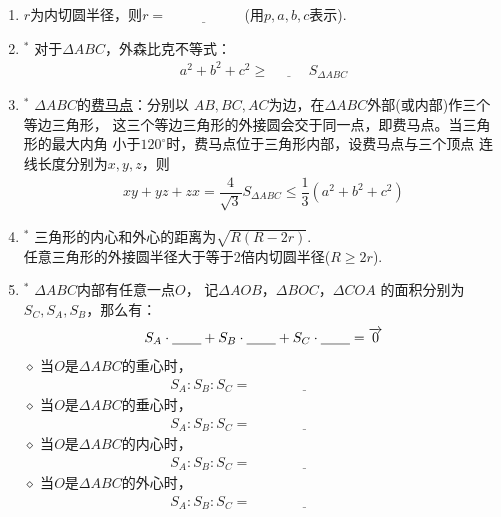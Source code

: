 \documentclass{article}
\newif\ifte
\renewcommand{\vec}{\overrightarrow}
\renewcommand\leq\leqslant
\renewcommand\geq\geqslant
\begin{document}
\begin{multicols}{2}
\begin{enumerate}[leftmargin=20pt]
\item $ r $为内切圆半径，则$ r=\underline{\ \ifte 
    \sqrt{\dfrac{(p-a)(p-b)(p-c)}{p}}\else \hspace{2cm} \fi\ } $
\ifte \else (用$ p,a,b,c $表示)\fi.

\item $^*$ 对于$ \Delta ABC $，外森比克不等式：
\begin{gather*}
    a^2+b^2+c^2 \geq \underline{\ \ifte 
        4\sqrt{3}\else \hspace{1cm} \fi\ }S_{\Delta ABC} 
\end{gather*}

\item $^*$ $ \Delta ABC $的\underline{费马点}：分别以
$ AB,BC,AC $为边，在$ \Delta ABC $外部(或内部)作三个等边三角形，
这三个等边三角形的外接圆会交于同一点，即费马点。当三角形的最大内角
小于$ 120^{\circ} $时，费马点位于三角形内部，设费马点与三个顶点
连线长度分别为$ x,y,z $，则
\begin{gather*}
    xy+yz+zx=\dfrac{4}{\sqrt{3}}S_{\Delta ABC}\leq 
    \dfrac{1}{3}(a^2+b^2+c^2)
\end{gather*}

\item $^*$ 三角形的内心和外心的距离为$ \sqrt{R(R-2r)} $.\\
任意三角形的外接圆半径大于等于2倍内切圆半径($ R\geq2r $).

\item $^*$ $ \Delta ABC $内部有任意一点$ O $，
记$ \Delta AOB $，$ \Delta BOC $，$ \Delta COA $
的面积分别为$ S_C,S_A,S_B $，那么有：
\begin{align*}
    S_A\cdot \underline{\ \ifte \vec{OA}
        \else \hspace{0.5cm} \fi\ }+ 
    S_B\cdot \underline{\ \ifte \vec{OB}
        \else \hspace{0.5cm} \fi\ }+
    S_C\cdot \underline{\ \ifte \vec{OC}
        \else \hspace{0.5cm} \fi\ }= \vec{0}
\end{align*}
$\diamond$ 当$ O $是$ \Delta ABC $的重心时，
\begin{gather*}
    S_A:S_B:S_C=\underline{\ \ifte 1:1:1
        \else \hspace{3cm} \fi\ }
\end{gather*}
$\diamond$ 当$ O $是$ \Delta ABC $的垂心时，
\begin{gather*}
    S_A:S_B:S_C=\underline{\ \ifte \tan A:
    \tan B:\tan C\else \hspace{3cm} \fi\ } 
\end{gather*}
$\diamond$ 当$ O $是$ \Delta ABC $的内心时，
\begin{gather*}
    S_A:S_B:S_C=\underline{\ \ifte a:b:c
        \else \hspace{3cm} \fi\ }
\end{gather*}
$\diamond$ 当$ O $是$ \Delta ABC $的外心时，
\begin{gather*}
    S_A:S_B:S_C=\underline{\ \ifte 
        \sin 2A:\sin 2B:\sin 2C
        \else \hspace{3cm} \fi\ }
\end{gather*}


\end{enumerate}
\end{multicols}
\end{document}
